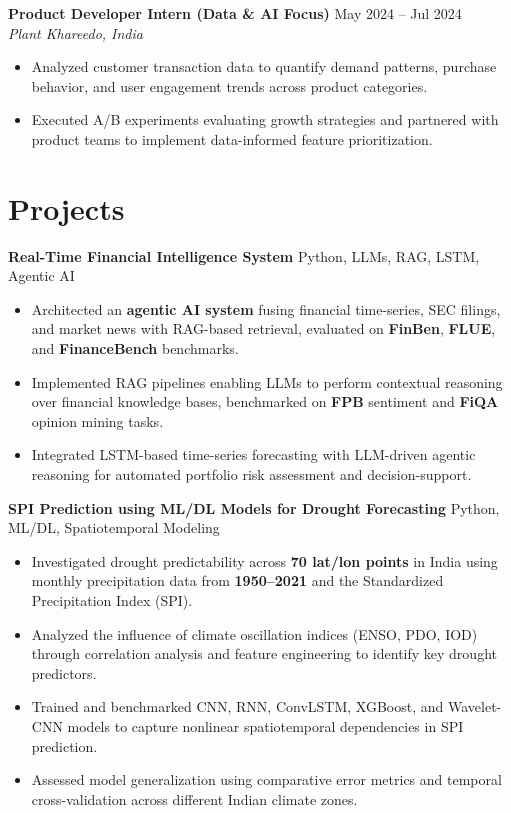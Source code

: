 \documentclass[a4paper, 10.5pt]{article}
\newcommand{\entry}[3]{%
  \vspace{4pt}%
  \textbf{#1} \hfill \textcolor{subtext}{\small #3}\\[-2pt]
  \textit{\textcolor{subtext}{#2}}%
  \vspace{2pt}%
}
\newcommand{\entrysingle}[2]{%
  \vspace{4pt}%
  \textbf{#1} \hfill \textcolor{subtext}{\small #2}%
  \vspace{2pt}%
}
\begin{document}
\entry{Product Developer Intern (Data \& AI Focus)}{Plant Khareedo, India}{May 2024 -- Jul 2024}
\begin{itemize}
  \item Analyzed customer transaction data to quantify demand patterns, purchase behavior, and user engagement trends across product categories.
  \item Executed A/B experiments evaluating growth strategies and partnered with product teams to implement data-informed feature prioritization.
\end{itemize}

\newpage

\section{Projects}

\entrysingle{Real-Time Financial Intelligence System}{\normalfont\small\textcolor{subtext}{Python, LLMs, RAG, LSTM, Agentic AI}}
\begin{itemize}
  \item Architected an \textbf{agentic AI system} fusing financial time-series, SEC filings, and market news with RAG-based retrieval, evaluated on \textbf{FinBen}, \textbf{FLUE}, and \textbf{FinanceBench} benchmarks.
  \item Implemented RAG pipelines enabling LLMs to perform contextual reasoning over financial knowledge bases, benchmarked on \textbf{FPB} sentiment and \textbf{FiQA} opinion mining tasks.
  \item Integrated LSTM-based time-series forecasting with LLM-driven agentic reasoning for automated portfolio risk assessment and decision-support.
\end{itemize}

\entrysingle{SPI Prediction using ML/DL Models for Drought Forecasting}{\normalfont\small\textcolor{subtext}{Python, ML/DL, Spatiotemporal Modeling}}
\begin{itemize}
  \item Investigated drought predictability across \textbf{70 lat/lon points} in India using monthly precipitation data from \textbf{1950--2021} and the Standardized Precipitation Index (SPI).
  \item Analyzed the influence of climate oscillation indices (ENSO, PDO, IOD) through correlation analysis and feature engineering to identify key drought predictors.
  \item Trained and benchmarked CNN, RNN, ConvLSTM, XGBoost, and Wavelet-CNN models to capture nonlinear spatiotemporal dependencies in SPI prediction.
  \item Assessed model generalization using comparative error metrics and temporal cross-validation across different Indian climate zones.
\end{itemize}
\end{document}

